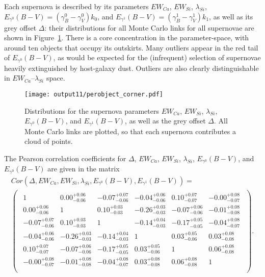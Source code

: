 \documentclass{aastex61}   	%
\begin{document}
Each supernova is described by its parameters $EW_{Ca}$, $EW_{Si}$, $\lambda_{Si}$, $E_{\gamma^0}(B-V)=(\gamma^0_B-\gamma^0_V)k_0$, and
$E_{\gamma^1}(B-V)=(\gamma^1_B-\gamma^1_V)k_1$, as well as its grey offset
$\Delta$: their distributions for all Monte Carlo links for all supernovae are shown in Figure~\ref{perobject:fig}.
There is a core concentration in the  parameter-space, with around ten objects that occupy its outskirts.
Many outliers appear in the red tail of $E_{\gamma^0}(B-V)$, as would be expected for the (infrequent) selection of supernovae
heavily extinguished by host-galaxy dust.
Outliers  are also clearly distinguishable in  $EW_{Ca}$--$\lambda_{Si}$ space.   

\begin{figure}[htbp] %
   \centering
   \texttt{[image: output11/perobject\_corner.pdf]} 
   \caption{Distributions for the supernova parameters $EW_{Ca}$, $EW_{Si}$, $\lambda_{Si}$, $E_{\gamma^0}(B-V)$, and $E_{\gamma^1}(B-V)$, as well as the grey offset
$\Delta$.  All Monte Carlo links are plotted, so that each supernova contributes a cloud of points.
   \label{perobject:fig}}
\end{figure}

The Pearson correlation coefficients for $\Delta$, $EW_{Ca}$, $EW_{Si}$, $\lambda_{Si}$, $E_{\gamma^0}(B-V)$, and $E_{\gamma^0}(B-V)$ are given in the matrix
\color{purple}
\begin{multline}
Cor(\Delta, EW_{Ca}, EW_{Si}, \lambda_{Si}, E_{\gamma^0}(B-V), E_{\gamma^1}(B-V)) =\\
\begin{pmatrix}
\begin{array}{rrrrrr}
1 & 0.00^{+0.06}_{-0.06} & -0.07^{+0.07}_{-0.06} & -0.04^{+0.06}_{-0.06} & 0.10^{+0.07}_{-0.07} & -0.00^{+0.08}_{-0.07} \\
0.00^{+0.06}_{-0.06} & 1 & 0.10^{+0.03}_{-0.03} & -0.26^{+0.03}_{-0.03} & -0.07^{+0.06}_{-0.06} & -0.01^{+0.08}_{-0.08} \\
-0.07^{+0.07}_{-0.06} & 0.10^{+0.03}_{-0.03} & 1 & -0.14^{+0.04}_{-0.03} & -0.17^{+0.05}_{-0.05} & -0.04^{+0.08}_{-0.07} \\
-0.04^{+0.06}_{-0.06} & -0.26^{+0.03}_{-0.03} & -0.14^{+0.04}_{-0.03} & 1 & 0.03^{+0.05}_{-0.06} & 0.03^{+0.08}_{-0.08} \\
0.10^{+0.07}_{-0.07} & -0.07^{+0.06}_{-0.06} & -0.17^{+0.05}_{-0.05} & 0.03^{+0.05}_{-0.06} & 1 & 0.06^{+0.08}_{-0.08} \\
-0.00^{+0.08}_{-0.07} & -0.01^{+0.08}_{-0.08} & -0.04^{+0.08}_{-0.07} & 0.03^{+0.08}_{-0.08} & 0.06^{+0.08}_{-0.08} & 1 \\
\end{array}
\end{pmatrix}.
\end{multline}
\color{black}
\end{document}
